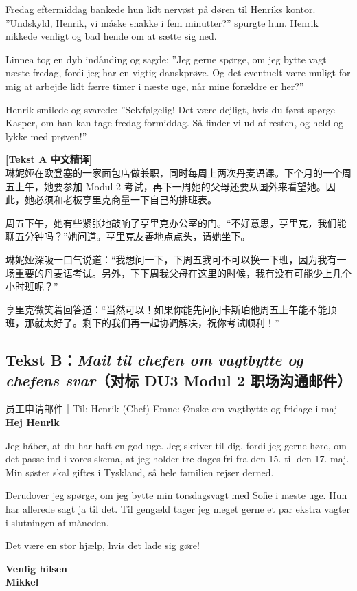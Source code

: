 Fredag eftermiddag bankede hun lidt nervøst på døren til Henriks kontor. ”Undskyld, Henrik,  vi måske snakke i fem minutter?” spurgte hun. Henrik nikkede venligt og bad hende om at sætte sig ned.

Linnea tog en dyb indånding og sagde: ”Jeg  gerne spørge, om jeg  bytte vagt næste fredag, fordi jeg har en vigtig danskprøve. Og  det eventuelt være muligt for mig at arbejde lidt færre timer i næste uge, når mine forældre er her?”

Henrik smilede og svarede: ”Selvfølgelig! Det  være dejligt, hvis du først  spørge Kasper, om han kan tage fredag formiddag. Så finder vi ud af resten, og held og lykke med prøven!”

\begin{transbox}
\small
\textbf{\color{NCDTeal}[Tekst A 中文精译]}\\
琳妮娅在欧登塞的一家面包店做兼职，同时每周上两次丹麦语课。下个月的一个周五上午，她要参加 Modul 2 考试，再下一周她的父母还要从国外来看望她。因此，她必须和老板亨里克商量一下自己的排班表。

周五下午，她有些紧张地敲响了亨里克办公室的门。“不好意思，亨里克，我们能聊五分钟吗？”她问道。亨里克友善地点点头，请她坐下。

琳妮娅深吸一口气说道：“我想问一下，下周五我可不可以换一下班，因为我有一场重要的丹麦语考试。另外，下下周我父母在这里的时候，我有没有可能少上几个小时班呢？”

亨里克微笑着回答道：“当然可以！如果你能先问问卡斯珀他周五上午能不能顶班，那就太好了。剩下的我们再一起协调解决，祝你考试顺利！”
\end{transbox}

\subsection*{Tekst B：\textit{Mail til chefen om vagtbytte og chefens svar}（对标 DU3 Modul 2 职场沟通邮件）}

\begin{emailbox}{员工申请邮件｜Til: Henrik (Chef) \quad Emne: Ønske om vagtbytte og fridage i maj}
\textbf{Hej Henrik}

Jeg håber, at du har haft en god uge. Jeg skriver til dig, fordi jeg gerne  høre, om det  passe ind i vores skema, at jeg holder tre dages fri fra den 15. til den 17. maj. Min søster skal giftes i Tyskland, så hele familien rejser derned.

Derudover  jeg spørge, om jeg  bytte min torsdagsvagt med Sofie i næste uge. Hun har allerede sagt ja til det. Til gengæld tager jeg meget gerne et par ekstra vagter i slutningen af måneden.

Det  være en stor hjælp, hvis det  lade sig gøre!

\textbf{Venlig hilsen}\\
\textbf{Mikkel}
\end{emailbox}

